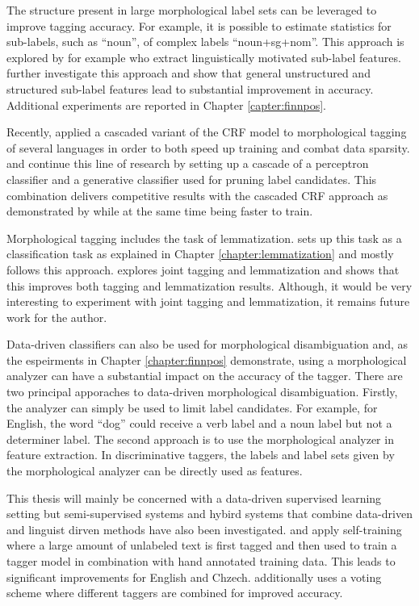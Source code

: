 The structure present in large morphological label sets can be
leveraged to improve tagging accuracy. For example, it is possible to
estimate statistics for sub-labels, such as ``noun'', of complex
labels ``noun+sg+nom''. This approach is explored by for example
\cite{Spoustova2009} who extract linguistically motivated sub-label
features. \cite{Silfverberg2015} further investigate this approach and
show that general unstructured and structured sub-label features lead
to substantial improvement in accuracy. Additional experiments are
reported in Chapter \ref{capter:finnpos}.

Recently, \cite{Muller2013} applied a cascaded variant of the CRF
model to morphological tagging of several languages in order to both
speed up training and combat data sparsity. \cite{Silfverberg2014} and
\cite{Silfverberg2015} continue this line of research by setting up a
cascade of a perceptron classifier and a generative classifier used
for pruning label candidates. This combination delivers competitive
results with the cascaded CRF approach as demonstrated by
\cite{Silfverberg2015} while at the same time being faster to train.

Morphological tagging includes the task of
lemmatization. \cite{Chrupala2008} sets up this task as a
classification task as explained in Chapter
\ref{chapter:lemmatization} and \cite{Silfverberg2015} mostly follows
this approach. \cite{Muller2015} explores joint tagging and
lemmatization and shows that this improves both tagging and
lemmatization results. Although, it would be very interesting to
experiment with joint tagging and lemmatization, it remains future
work for the author. 

Data-driven classifiers can also be used for morphological
disambiguation and, as the espeirments in Chapter
\ref{chapter:finnpos} demonstrate, using a morphological analyzer can
have a substantial impact on the accuracy of the tagger. There are two
principal apporaches to data-driven morphological
disambiguation. Firstly, the analyzer can simply be used to limit
label candidates. For example, for English, the word ``dog'' could
receive a verb label and a noun label but not a determiner label. The
second approach is to use the morphological analyzer in feature
extraction. In discriminative taggers, the labels and label sets given
by the morphological analyzer can be directly used as features.

This thesis will mainly be concerned with a data-driven supervised
learning setting but semi-supervised systems and hybird systems that
combine data-driven and linguist dirven methods have also been
investigated. \cite{Spoustova2009} and \cite{Sogaard2011} apply
self-training where a large amount of unlabeled text is first tagged
and then used to train a tagger model in combination with hand
annotated training data. This leads to significant improvements for
English and Chzech. \cite{Spoustova2009} additionally uses a voting
scheme where different taggers are combined for improved accuracy.

